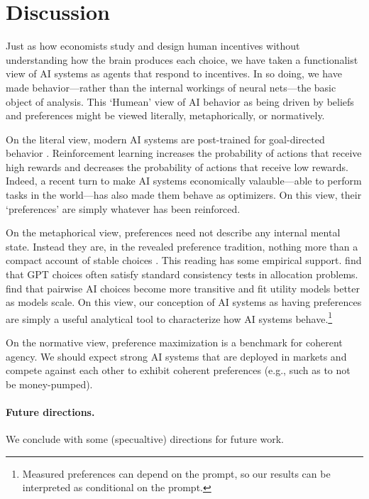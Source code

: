 \documentclass[12pt,reqno]{article}
\theoremstyle{definition} \newtheorem{example}{Example}
\theoremstyle{definition} \newtheorem{condition}{Condition}
\theoremstyle{definition} \newtheorem{corollary}{Corollary}
\theoremstyle{definition} \newtheorem{claim}{Claim}
\theoremstyle{definition} \newtheorem{definition}{Definition}
\theoremstyle{definition} \newtheorem{conjecture}{Conjecture}
\theoremstyle{definition} \newtheorem{Lemma}{Lemma}
\theoremstyle{definition} \newtheorem{lemma}{Lemma}
\theoremstyle{plain} \newtheorem{theorem}{Theorem}
\theoremstyle{definition} \newtheorem{assumption}{Assumption}
\theoremstyle{definition} \newtheorem*{assumptionnonumber}{Assumption}
\theoremstyle{definition} \newtheorem*{theoremNoNumber}{Proposition}
\theoremstyle{definition}\newtheorem{proposition}{Proposition}
\theoremstyle{definition} \newtheorem{observation}{Observation}
\theoremstyle{definition} \newtheorem*{definitionNoNumber}{Definition}
\theoremstyle{definition} \newtheorem{Definition}{Definition}
\theoremstyle{definition} \newtheorem*{DefinitionNoNumber}{Definition}
\theoremstyle{definition} \newtheorem*{fact}{Fact}
\theoremstyle{definition} \newtheorem*{property}{Property}
\theoremstyle{definition} \newtheorem{remark}{Remark}
\theoremstyle{definition}\newtheorem{romanexampleinner}{Example}
\begin{document}
\section{Discussion}\label{sec:literature}
Just as how economists study and design human incentives without understanding how the brain produces each choice, we have taken a functionalist view of AI systems as agents that respond to incentives. In so doing, we have made behavior---rather than the internal workings of neural nets---the basic object of analysis. This `Humean' view of AI behavior as being driven by beliefs and preferences might be viewed literally, metaphorically, or normatively. 

On the literal view, modern AI systems are post-trained for goal-directed behavior \citep{ouyang2022training,bai2022training}. Reinforcement learning increases the probability of actions that receive high rewards and decreases the probability of actions that receive low rewards. Indeed, a recent turn to make AI systems economically valauble---able to perform tasks in the world---has also made them behave as optimizers. On this view, their `preferences' are simply whatever has been reinforced.  

%

On the metaphorical view, preferences need not describe any internal mental state. Instead they are, in the revealed preference tradition,  nothing more than a compact account of stable choices \citep{gul2008case}. This reading has some empirical support. \citet{chen2023emergence} find that GPT choices often satisfy standard consistency tests in allocation problems. \citet{mazeika2025utility} find that pairwise AI choices become more transitive and fit utility models better as models scale. On this view, our conception of AI systems as having preferences are simply a useful analytical tool to characterize how AI systems behave.\footnote{Measured preferences can depend on the prompt, so our results can be interpreted as conditional on the prompt.}

On the normative view, preference maximization is a benchmark for coherent agency. We should expect strong AI systems that are deployed in markets and compete against each other to exhibit coherent preferences (e.g., such as to not be money-pumped).

\paragraph{Future directions.} We conclude with some (specualtive) directions for future work. 
\end{document}
